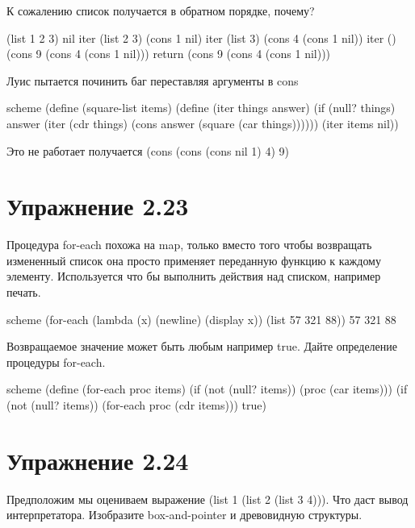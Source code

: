 К сожалению список получается в обратном порядке, почему?

(list 1 2 3) nil
iter (list 2 3) (cons 1 nil)
iter (list 3) (cons 4 (cons 1 nil))
iter () (cons 9 (cons 4 (cons 1 nil)))
return (cons 9 (cons 4 (cons 1 nil)))

Луис пытается починить баг переставляя аргументы в cons

\begin{codelisting}{scheme}
(define (square-list items)
  (define (iter things answer)
    (if (null? things)
        answer
        (iter (cdr things)
              (cons answer
                    (square (car things))))))
  (iter items nil))
\end{codelisting}

Это не работает получается (cons (cons (cons nil 1) 4) 9)


\chapter{Упражнение 2.23}

Процедура for-each похожа на map, только вместо того чтобы возвращать измененный список она просто применяет переданную функцию к каждому элементу. Используется что бы выполнить действия над списком, например печать.

\begin{codelisting}{scheme}
(for-each (lambda (x) (newline) (display x))
          (list 57 321 88))
57
321
88
\end{codelisting}

Возвращаемое значение может быть любым например true. Дайте определение процедуры for-each.

\begin{codelisting}{scheme}
(define (for-each proc items)
  (if (not (null? items))
      (proc (car items)))
  (if (not (null? items))
      (for-each proc (cdr items)))
  true)
\end{codelisting}


\chapter{Упражнение 2.24}

Предположим мы оцениваем выражение (list 1 (list 2 (list 3 4))). Что даст вывод интерпретатора. Изобразите box-and-pointer и древовидную структуры.


